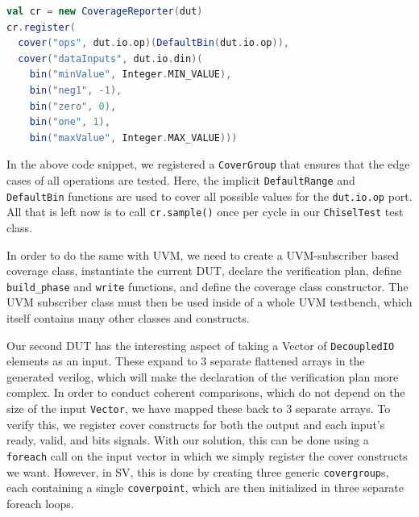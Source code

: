\documentclass[a4paper]{IEEEtran}
\newcommand{\martin}[1]{{\color{blue} Martin: #1}}
\begin{document}
\begin{lstlisting}[language=scala] 
val cr = new CoverageReporter(dut)  
cr.register(
  cover("ops", dut.io.op)(DefaultBin(dut.io.op)),
  cover("dataInputs", dut.io.din)(
    bin("minValue", Integer.MIN_VALUE),
    bin("neg1", -1),
    bin("zero", 0),
    bin("one", 1),
    bin("maxValue", Integer.MAX_VALUE)))
\end{lstlisting}
In the above code snippet, we registered a \texttt{CoverGroup} that ensures that the edge cases of all operations are tested.
Here, the implicit \texttt{DefaultRange} and \texttt{DefaultBin} functions are used to cover all possible values for the \texttt{dut.io.op} port.
All that is left now is to call \texttt{cr.sample()} once per cycle in our \texttt{ChiselTest} test class.

In order to do the same with UVM, we need to 
create a UVM-subscriber based coverage class, 
instantiate the current DUT, %
declare the verification plan, 
define \texttt{build\_phase} and \texttt{write} functions, 
and define the coverage class constructor.
The UVM subscriber class must then be used inside of a whole UVM testbench, which itself contains many other classes and constructs.

Our second DUT has the interesting aspect of taking a Vector of \texttt{DecoupledIO} elements as an input. 
These expand to 3 separate flattened arrays in the generated verilog, which will make the declaration of the verification plan more complex. %
In order to conduct coherent comparisons, which do not depend on the size of the input \texttt{Vector}, we have mapped these back to 3 separate arrays.
To verify this, we register cover constructs for both the output and each input's ready, valid, and bits signals.
With our solution, this can be done using a \texttt{foreach} call on the input vector in which we simply register the cover constructs we want.
However, in SV, this is done by creating three generic \texttt{covergroup}s, each containing a single \texttt{coverpoint}, which are then initialized in three separate foreach loops.
 
\end{document}
